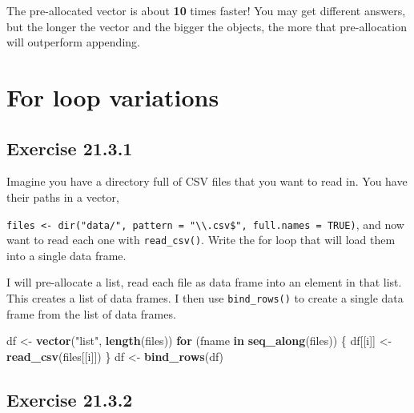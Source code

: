 \documentclass[]{book}
\newenvironment{Shaded}{\begin{snugshade}}{\end{snugshade}}
\newcommand{\ControlFlowTok}[1]{\textcolor[rgb]{0.13,0.29,0.53}{\textbf{#1}}}
\newcommand{\KeywordTok}[1]{\textcolor[rgb]{0.13,0.29,0.53}{\textbf{#1}}}
\newcommand{\NormalTok}[1]{#1}
\newcommand{\StringTok}[1]{\textcolor[rgb]{0.31,0.60,0.02}{#1}}
\theoremstyle{plain}
\theoremstyle{remark}
\begin{document}
The pre-allocated vector is about \textbf{10} times faster! You may get
different answers, but the longer the vector and the bigger the objects,
the more that pre-allocation will outperform appending.

\hypertarget{for-loop-variations}{%
\section{For loop variations}\label{for-loop-variations}}

\hypertarget{exercise-21.3.1}{%
\subsection*{\texorpdfstring{Exercise
{21.3.1}}{Exercise 21.3.1}}\label{exercise-21.3.1}}

Imagine you have a directory full of CSV files that you want to read in.
You have their paths in a vector,

\texttt{files\ \textless{}-\ dir("data/",\ pattern\ =\ "\textbackslash{}\textbackslash{}.csv\$",\ full.names\ =\ TRUE)},
and now want to read each one with \texttt{read\_csv()}. Write the for
loop that will load them into a single data frame.

I will pre-allocate a list, read each file as data frame into an element
in that list. This creates a list of data frames. I then use
\texttt{bind\_rows()} to create a single data frame from the list of
data frames.

\begin{Shaded}
\begin{Highlighting}[]
\NormalTok{df <-}\StringTok{ }\KeywordTok{vector}\NormalTok{(}\StringTok{"list"}\NormalTok{, }\KeywordTok{length}\NormalTok{(files))}
\ControlFlowTok{for}\NormalTok{ (fname }\ControlFlowTok{in} \KeywordTok{seq_along}\NormalTok{(files)) \{}
\NormalTok{  df[[i]] <-}\StringTok{ }\KeywordTok{read_csv}\NormalTok{(files[[i]])}
\NormalTok{\}}
\NormalTok{df <-}\StringTok{ }\KeywordTok{bind_rows}\NormalTok{(df)}
\end{Highlighting}
\end{Shaded}

\hypertarget{exercise-21.3.2}{%
\subsection*{\texorpdfstring{Exercise
{21.3.2}}{Exercise 21.3.2}}\label{exercise-21.3.2}}
\end{document}
